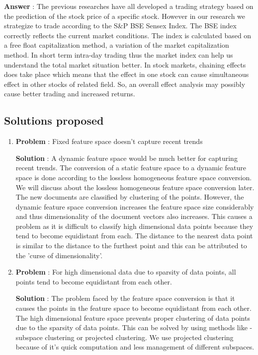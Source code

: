 \documentclass[review,twocolumn,5p]{elsarticle}
\begin{document}
\begin{enumerate}
\textbf{Answer} : The previous researches have all developed a trading strategy based on the prediction of the stock price of a specific stock. However in our research we strategize to trade according to the S\&P BSE Sensex Index. The BSE index correctly reflects the current market conditions. The index is calculated based on a free float capitalization method, a variation of the market capitalization method. In short term intra-day trading thus the market index can help us understand the total market situation better. In stock markets, chaining effects does take place which means that the effect in one stock can cause simultaneous effect in other stocks of related field. So, an overall effect analysis may possibly cause better trading and increased returns. 
\end{enumerate}

\subsection{Solutions proposed}
\begin{enumerate}
\item \textbf{Problem} : Fixed feature space doesn't capture recent trends

\textbf{Solution} : A dynamic feature space would be much better for capturing recent trends. The conversion of a static feature space to a dynamic feature space is done according to the lossless homogeneous feature space conversion. We will discuss about the lossless homogeneous feature space conversion later. The new documents are classified by clustering of the points. However, the dynamic feature space conversion increases the feature space size considerably and thus dimensionality of the document vectors also increases. This causes a problem as it is difficult to classify high dimensional data points because they tend to become equidistant from each. The distance to the nearest data point is similar to the distance to the furthest point \cite{Beyer:1999} and this can be attributed to the 'curse of dimensionality'. 

\item \textbf{Problem} : For high dimensional data due to sparsity of data points, all points tend to become equidistant from each other.

\textbf{Solution} : The problem faced by the feature space conversion is that it causes the points in the feature space to become equidistant from each other. The high dimensional feature space prevents proper clustering of data points due to the sparsity of data points. This can be solved by using methods like - subspace clustering or projected clustering. We use projected clustering because of it's quick computation and less management of different subspaces.
\end{enumerate}
\end{document}
